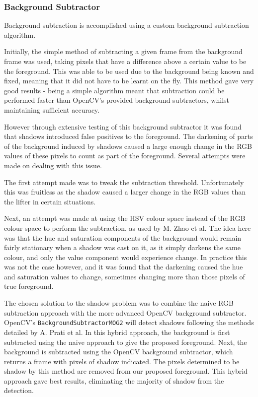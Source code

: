 \subsubsection{Background Subtractor}
\label{subsec:bgsub}

Background subtraction is accomplished using a custom background subtraction algorithm.

Initially, the simple method of subtracting a given frame from the background frame was used, taking pixels that have a difference above a certain value to be the foreground. This was able to be used due to the background being known and fixed, meaning that it did not have to be learnt on the fly. This method gave very good results - being a simple algorithm meant that subtraction could be performed faster than OpenCV's provided background subtractors, whilst maintaining sufficient accuracy.

However through extensive testing of this background subtractor it was found that shadows introduced false positives to the foreground. The darkening of parts of the background induced by shadows caused a large enough change in the RGB values of these pixels to count as part of the foreground. Several attempts were made on dealing with this issue.

The first attempt made was to tweak the subtraction threshold. Unfortunately this was fruitless as the shadow caused a larger change in the RGB values than the lifter in certain situations.

Next, an attempt was made at using the HSV colour space instead of the RGB colour space to perform the subtraction, as used by M. Zhao et al\cite{bgsubhsv}. The idea here was that the hue and saturation components of the background would remain fairly stationary when a shadow was cast on it, as it simply darkens the same colour, and only the value component would experience change. In practice this was not the case however, and it was found that the darkening caused the hue and saturation values to change, sometimes changing more than those pixels of true foreground.

The chosen solution to the shadow problem was to combine the naive RGB subtraction approach with the more advanced OpenCV background subtractor. OpenCV's \verb!BackgroundSubtractorMOG2! will detect shadows following the methods detailed by A. Prati et al\cite{bgsubmog2}. In this hybrid approach, the background is first subtracted using the naive approach to give the proposed foreground. Next, the background is subtracted using the OpenCV background subtractor, which returns a frame with pixels of shadow indicated. The pixels determined to be shadow by this method are removed from our proposed foreground. This hybrid approach gave best results, eliminating the majority of shadow from the detection.

